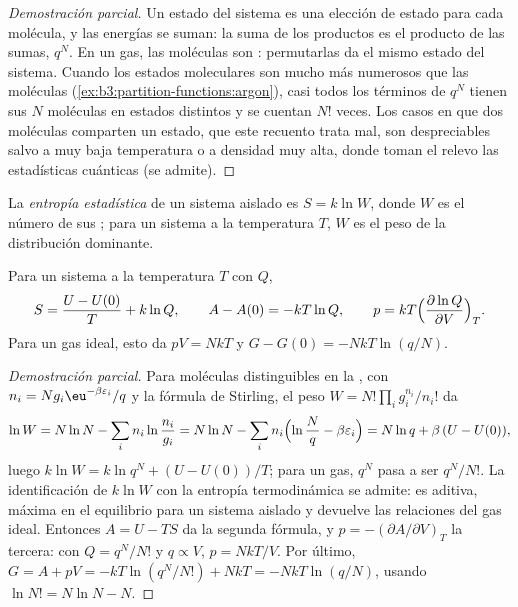 \begin{proof}[Demostración parcial]
Un estado del sistema es una elección de estado para cada molécula, y las energías
se suman: la suma de los productos es el producto de las sumas, $q^N$. En un gas, las
moléculas son : permutarlas da el mismo estado del
sistema. Cuando los estados moleculares son mucho más numerosos que las moléculas
(\cref{ex:b3:partition-functions:argon}), casi todos los términos de $q^N$ tienen sus $N$
moléculas en estados distintos y se cuentan $N!$ veces. Los casos en que dos
moléculas comparten un estado, que este recuento trata mal, son despreciables salvo
a muy baja temperatura o a densidad muy alta, donde toman el relevo las estadísticas cuánticas
(se admite).
\end{proof}

\begin{definition}\label{def:b3:partition-functions:statistical-entropy}
La \emph{entropía estadística} de un sistema aislado es
$S = k\ln W$, donde $W$ es el número de sus ; para un sistema a la
temperatura $T$, $W$ es el peso de la distribución dominante.
\end{definition}

\begin{theorem}\label{thm:b3:partition-functions:entropy}
Para un sistema a la temperatura $T$ con  $Q$,
\[
  S = \frac{U - U(0)}{T} + k\ln Q, \qquad A - A(0) = -kT\ln Q, \qquad
  p = kT\Bigl(\frac{\partial\ln Q}{\partial V}\Bigr)_T .
\]
Para un gas ideal, esto da $pV = NkT$ y $G - G(0) = -NkT\ln(q/N)$.
\end{theorem}

\begin{proof}[Demostración parcial]
Para moléculas distinguibles en la , con $n_i = Ng_i\eu^{-\beta\varepsilon_i}/q$
y la fórmula de Stirling, el peso $W = N!\prod_ig_i^{n_i}/n_i!$ da
\[
  \ln W = N\ln N - \sum_in_i\ln\frac{n_i}{g_i} = N\ln N - \sum_in_i\Bigl(\ln\frac Nq - \beta\varepsilon_i\Bigr)
        = N\ln q + \beta\,(U - U(0)),
\]
luego $k\ln W = k\ln q^N + (U - U(0))/T$; para un gas, $q^N$ pasa a ser $q^N/N!$. La
identificación de $k\ln W$ con la entropía termodinámica se admite: es
aditiva, máxima en el equilibrio para un sistema aislado y devuelve las
relaciones del gas ideal. Entonces $A = U - TS$ da la segunda fórmula, y $p =
-(\partial A/\partial V)_T$ la tercera: con $Q = q^N/N!$ y $q \propto V$, $p = NkT/V$. Por último,
$G = A + pV = -kT\ln(q^N/N!) + NkT = -NkT\ln(q/N)$, usando $\ln N! = N\ln N - N$.
\end{proof}

